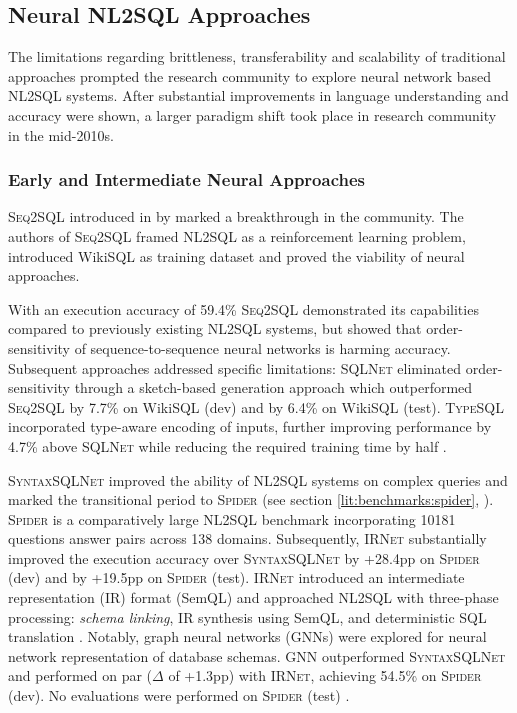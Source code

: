 \subsection{Neural NL2SQL Approaches}

The limitations regarding brittleness, transferability and scalability
of traditional approaches prompted the research community to explore
neural network based NL2SQL systems. After substantial improvements in language
understanding and accuracy were shown, a larger paradigm shift took place in
research community in the mid-2010s.

\subsubsection{Early and Intermediate Neural Approaches}

\textsc{Seq2SQL} introduced in \citeyear{Seq2SQL} by \citeauthor{Seq2SQL}
marked a breakthrough in the community. The authors of \textsc{Seq2SQL} framed
NL2SQL as a reinforcement learning problem, introduced WikiSQL as training
dataset and proved the viability of neural approaches.

With an execution accuracy of 59.4\% \textsc{Seq2SQL} demonstrated its
capabilities compared to previously existing NL2SQL systems, but showed that
order-sensitivity of sequence-to-sequence neural networks is harming accuracy. 
Subsequent approaches addressed specific limitations: \textsc{SQLNet}
eliminated order-sensitivity through a sketch-based generation approach which
outperformed \textsc{Seq2SQL} by 7.7\% on WikiSQL (dev) and by 6.4\% on WikiSQL
(test). \textsc{TypeSQL} incorporated type-aware encoding of inputs, further
improving performance by 4.7\% above \textsc{SQLNet} while reducing the
required training time by half \citep{TypeSQL}. 

\textsc{SyntaxSQLNet} improved the ability of NL2SQL systems on complex
queries and marked the transitional period to \textsc{Spider} (see section
\ref{lit:benchmarks:spider}, \cite{Spider}). \textsc{Spider} is a comparatively
large NL2SQL benchmark incorporating 10181 questions answer pairs across 138
domains. Subsequently, \textsc{IRNet} substantially improved the execution
accuracy over \textsc{SyntaxSQLNet} by +28.4pp on \textsc{Spider} (dev) and by
+19.5pp on \textsc{Spider} (test). \textsc{IRNet} introduced an intermediate
representation (IR) format (SemQL) and approached NL2SQL with three-phase
processing: \textit{schema linking}, IR synthesis using SemQL, and
deterministic SQL translation \citep{IRNet}. Notably, graph neural networks
(GNNs) were explored for neural network representation of database schemas.
\textsc{GNN} outperformed \textsc{SyntaxSQLNet} and performed on par ($\Delta$
of +1.3pp) with \textsc{IRNet}, achieving 54.5\% on \textsc{Spider} (dev). No
evaluations were performed on \textsc{Spider} (test) \citep{GNN}.

